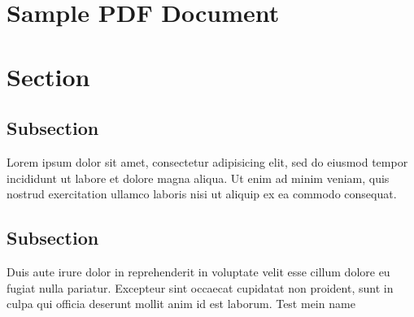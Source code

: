 \documentclass[12pt]{article}
\begin{document}
\section*{Sample PDF Document}

\section{Section}

\subsection{Subsection}

Lorem ipsum dolor sit amet, consectetur adipisicing elit, sed do eiusmod tempor incididunt ut labore et dolore magna aliqua. Ut enim ad minim veniam, quis nostrud exercitation ullamco laboris nisi ut aliquip ex ea commodo consequat.

\subsection{Subsection}

Duis aute irure dolor in reprehenderit in voluptate velit esse cillum dolore eu fugiat nulla pariatur. Excepteur sint occaecat cupidatat non proident, sunt in culpa qui officia deserunt mollit anim id est laborum. Test mein name 
\end{document}
